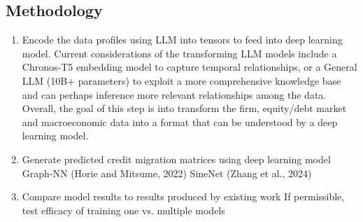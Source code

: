 \documentclass[10pt]{article}
\begin{document}
\begin{multicols*}{2}
\section{Methodology}\label{methodology}
\begin{enumerate}
	\item Encode the data profiles using LLM into tensors to feed into deep learning model.
	Current considerations of the transforming LLM models include a Chronos-T5 embedding model to capture temporal relationships, or a General LLM (10B+ parameters) to exploit a more comprehensive knowledge base and can perhaps inference more relevant relationships among the data.
	Overall, the goal of this step is into transform the firm, equity/debt market and macroeconomic data into a format that can be understood by a deep learning model. 
	\item Generate predicted credit migration matrices using deep learning model
	Graph-NN (Horie and Mitsume, 2022)
	SineNet (Zhang et al., 2024)
	\item Compare model results to results produced by existing work
	If permissible, test efficacy of training one vs. multiple models 
\end{enumerate}

%
%
%	

\end{multicols*}

\clearpage


	
\end{document}
